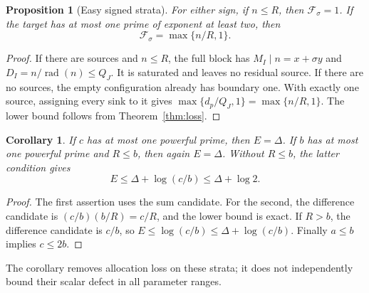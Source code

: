 \documentclass[11pt]{article}
\newtheorem{proposition}[theorem]{Proposition}
\newtheorem{corollary}[theorem]{Corollary}
\theoremstyle{definition}\newtheorem{definition}[theorem]{Definition}
\theoremstyle{remark}\newtheorem{remark}[theorem]{Remark}
\DeclareMathOperator{\rad}{rad}
\newcommand{\F}{\mathcal F}
\begin{document}
\begin{proposition}[Easy signed strata]\label{prop:easy}
For either sign, if \(n\le R\), then \(\F_\sigma=1\). If the target has at most one prime of exponent at least two, then
\[
 \F_\sigma=\max\{n/R,1\}.
\]
\end{proposition}
\begin{proof}
If there are sources and \(n\le R\), the full block has \(M_I\mid n=x+\sigma y\) and \(D_I=n/\rad(n)\le Q_J\). It is saturated and leaves no residual source. If there are no sources, the empty configuration already has boundary one. With exactly one source, assigning every sink to it gives \(\max\{d_p/Q_J,1\}=\max\{n/R,1\}\). The lower bound follows from Theorem~\ref{thm:loss}.
\end{proof}
\begin{corollary}\label{cor:one}
If \(c\) has at most one powerful prime, then \(E=\Delta\). If \(b\) has at most one powerful prime and \(R\le b\), then again \(E=\Delta\). Without \(R\le b\), the latter condition gives
\[
 E\le\Delta+\log(c/b)\le\Delta+\log2.
\]
\end{corollary}
\begin{proof}
The first assertion uses the sum candidate. For the second, the difference candidate is \((c/b)(b/R)=c/R\), and the lower bound is exact. If \(R>b\), the difference candidate is \(c/b\), so \(E\le\log(c/b)\le\Delta+\log(c/b)\). Finally \(a\le b\) implies \(c\le2b\).
\end{proof}
The corollary removes allocation loss on these strata; it does not independently bound their scalar defect in all parameter ranges.
\end{document}
